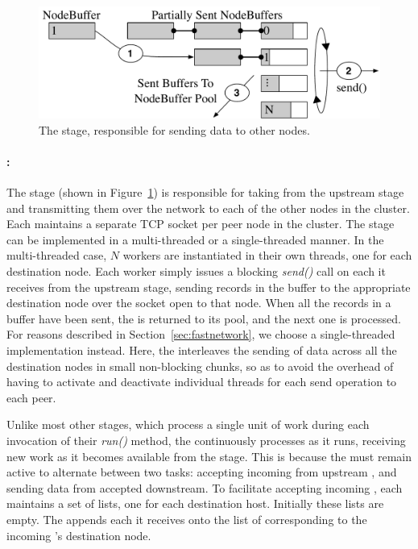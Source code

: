 \begin{figure}
  \centering
  \includegraphics[width=\columnwidth]{tritonsort/figs/sender_stage.pdf}
  \caption{The \sender stage, responsible for sending data to
    other nodes.}
  \label{fig:sender}
\end{figure}

\paragraph{\sender:}  The \sender stage (shown in Figure~\ref{fig:sender}) is
responsible for taking \nodebuffers from the upstream \pnts stage and
transmitting them over the network to each of the other nodes in the cluster.
Each \sender maintains a separate TCP socket per peer node in the cluster.  The
\sender stage can be implemented in a multi-threaded or a single-threaded
manner.  In the multi-threaded case, $N$ \sender workers are instantiated in
their own threads, one for each destination node.  Each \sender worker simply
issues a blocking \textit{send()} call on each \nodebuffer it receives from the
upstream \pnts stage, sending records in the buffer to the appropriate
destination node over the socket open to that node.  When all the records in a
buffer have been sent, the \nodebuffer is returned to its pool, and the next
one is processed.  For reasons described in Section~\ref{sec:fastnetwork}, we
choose a single-threaded \sender implementation instead.  Here, the \sender
interleaves the sending of data across all the destination nodes in small
non-blocking chunks, so as to avoid the overhead of having to activate and
deactivate individual threads for each send operation to each peer.

Unlike most other stages, which process a single unit of work during each
invocation of their \textit{run()} method, the \sender continuously processes
\nodebuffers as it runs, receiving new work as it becomes available from the
\pnts stage.  This is because the \sender must remain active to alternate
between two tasks: accepting incoming \nodebuffers from upstream \pntss, and
sending data from accepted \nodebuffers downstream.  To facilitate accepting
incoming \nodebuffers, each \sender maintains a set of \nodebuffer lists, one
for each destination host.  Initially these lists are empty.  The \sender
appends each \nodebuffer it receives onto the list of \nodebuffers
corresponding to the incoming \nodebuffer's destination node.

